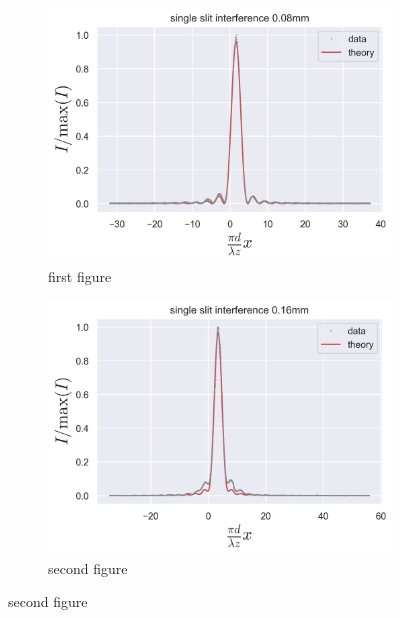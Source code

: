 \begin{figure}[H]
	\centering
	\begin{subfigure}{0.5\columnwidth}
		\centering
		\includegraphics[width=\columnwidth]{figures/single slit interference 0.08mm.png} %
		\caption{first figure}
        \label{fig:single slit interference 0.08mm}
	\end{subfigure}\hfill
    \begin{subfigure}{0.5\columnwidth}
        \centering
        \includegraphics[width=\columnwidth]{figures/single slit interference 0.16mm.png} %
        \caption{second figure}
        \label{fig:single slit interference 0.16mm}
    \end{subfigure}
    \label{fig:single slit examples}
\end{figure}
